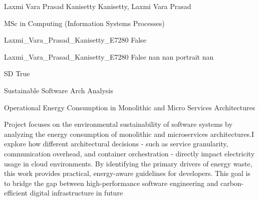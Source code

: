
\begingroup{}\relax



\def\Key{Laxmi_Vara_Prasad_Kanisetty_E7280}

{Laxmi Vara Prasad Kanisetty}
{Kanisetty, Laxmi Vara Prasad}

{MSc in Computing (Information Systems Processes)}

{Laxmi_Vara_Prasad_Kanisetty_E7280}
{False}

{Laxmi_Vara_Prasad_Kanisetty_E7280}
{False}
{nan}
{nan}
{portrait}
{nan}

{SD}
{True}

{Sustainable Software Arch Analysis}

{Operational Energy Consumption in Monolithic and Micro Services Architectures}

{Project focuses on the environmental sustainability of software systems by analyzing the energy consumption of monolithic and microservices architectures.I explore how different architectural decisions - such as service granularity, communication overhead, and container orchestration - directly impact electricity usage in cloud environments. By identifying the primary drivers of energy waste, this work provides practical, energy-aware guidelines for developers. This goal is to bridge the gap between high-performance software engineering and carbon-efficient digital infrastructure in future}

